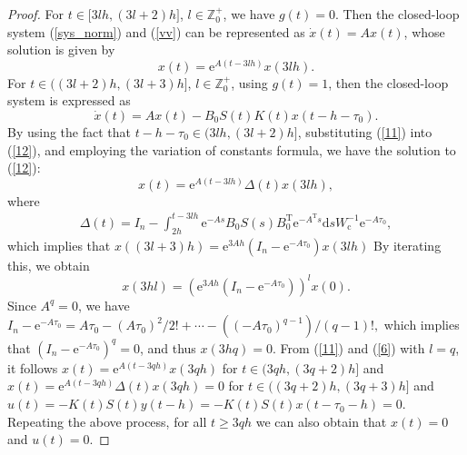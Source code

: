\documentclass[10pt,a4paper]{amsart}
\begin{document}
\begin{proof}
For $t\in\lbrack3lh,(3l+2)h]$, $l\in%
\mathbb{Z}
_{0}^{+}$, we have $g(t)=0$. Then the closed-loop system (\ref{sys_norm}) and
(\ref{vv}) can be represented as $\dot{x}(t)=Ax(t)$, whose solution is given
by
\begin{equation}
x(t)=\mathrm{e}^{A(t-3lh)}x(3lh). \label{11}%
\end{equation}
For $t\in((3l+2)h,(3l+3)h]$, $l\in%
\mathbb{Z}
_{0}^{+}$, using $g(t)=1$, then the closed-loop system is expressed as
\begin{equation}
\dot{x}(t)=Ax(t)-B_{0}S(t)K\left(
t\right)  x\left(  t-h-\tau_{0}\right)  . \label{12}%
\end{equation}
By using the fact that $t-h-\tau_{0}\in(3lh,(3l+2)h]$, substituting (\ref{11})
into (\ref{12}), and employing the variation of constants formula, we have the
solution to (\ref{12}):
\begin{equation}
x\left(  t\right)  =\mathrm{e}^{A\left(  t-3lh\right)  }\mathit{\Delta
}(t)x\left(  3lh\right)  , \label{6}%
\end{equation}
where
\begin{align}
\mathit{\Delta}(t)=  I_{n}-\int_{2h}^{t-3lh}\mathrm{e}^{-As}B_{0}S(s) B_{0}^{\mathrm{T}}\mathrm{e}^{-A^{\mathrm{T}}s}\mathrm{d}%
sW_{\mathrm{c}}^{-1}\mathrm{e}^{-A\tau_{0}}, \label{delta}%
\end{align}
which implies that
$x((3l+3)h)  =\mathrm{e}^{3Ah}(  I_{n}-\mathrm{e}^{-A\tau_{0}})  x(
3lh)$
By iterating this, we obtain
\begin{equation}
x\left(  3hl\right)  =\left(  \mathrm{e}^{3Ah}\left(  I_{n}-\mathrm{e}%
^{-A\tau_{0}}\right)  \right)  ^{l}x\left(  0\right)  .\label{x_3lh00}%
\end{equation}
Since $A^{q}=0$, we have
$I_{n}-\mathrm{e}^{-A\tau_{0}}=A\tau_{0}-(A\tau_{0})^{2}/2!+\cdots-((-A\tau_{0})  ^{q-1})/(q-1)!,
$
which implies that $(I_{n}-\mathrm{e}^{-A\tau_{0}}) ^{q}=0$, and thus $x(3hq)=0$. From (\ref{11}) and (\ref{6}) with $l=q$, it follows $x(t)=\mathrm{e}^{A(t-3qh)}x(3qh)$ for $t\in(3qh,(3q+2)h]$ and $x(t)=\mathrm{e}^{A(t-3qh)}\mathit{\Delta}(t)x(3qh)=0$ for $t\in((3q+2)h,(3q+3)h]$ and $u(t)=-K(t)S(t)y(t-h)=-K(t)S(t)x(t-\tau_{0}-h)=0$.
Repeating the above process, for all $t\geq3qh$ we can also obtain that
$x(t)=0$ and $u(t)=0$.
\end{proof}
\end{document}

